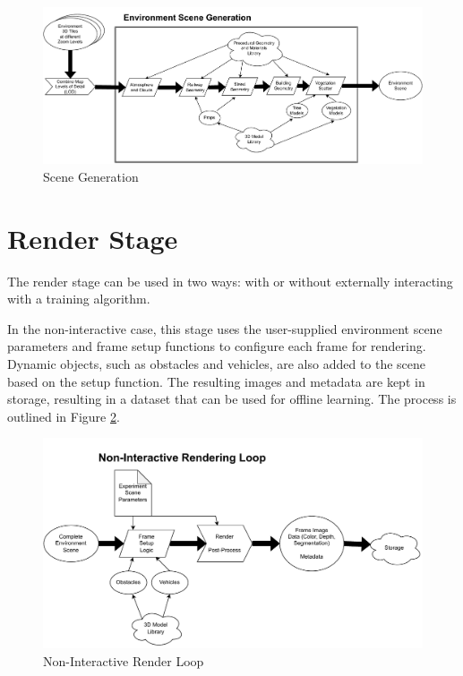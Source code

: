 \begin{figure}[H]
    \centering
    \includegraphics[width=14cm]{src/img/fig/fig-3 environment scene generation.drawio.pdf}
    \caption{Scene Generation}
    \label{fig:design-scene-generation}
\end{figure}


\section{Render Stage}
\label{sec:render-stage}


The render stage can be used in two ways: with or without externally interacting with a training algorithm.

In the non-interactive case, this stage uses the user-supplied environment scene parameters and frame setup functions to configure each frame for rendering. Dynamic objects, such as obstacles and vehicles, are also added to the scene based on the setup function. The resulting images and metadata are kept in storage, resulting in a dataset that can be used for offline learning. The process is outlined in Figure \ref{fig:design-render-non-interactive}.


\begin{figure}[h]
    \centering
    \includegraphics[width=14.5cm]{src/img/fig/fig-4 non-interactive render loop.drawio.pdf}
    \caption{Non-Interactive Render Loop}
    \label{fig:design-render-non-interactive}

\end{figure}



